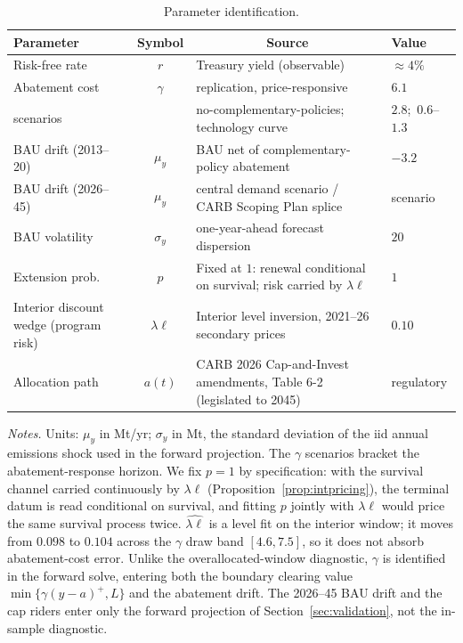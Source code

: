\documentclass[11pt,letterpaper]{article}
\theoremstyle{plain}
\theoremstyle{definition}
\numberwithin{equation}{section}
\begin{document}
\begin{table}[h]\centering
\caption{Parameter identification.}\label{tab:calib}
\footnotesize
\begin{tabular}{@{}l c p{} l@{}}
\toprule
Parameter & Symbol & \multicolumn{1}{c}{Source} & Value\\
\midrule
Risk-free rate        & $r$        & Treasury yield (observable)                          & $\approx 4\%$\\
Abatement cost        & $\gamma$   & \citet{borenstein2019} replication, price-responsive & $6.1$\\
\quad scenarios       &            & no-complementary-policies; technology curve          & $2.8$;\ $0.6$--$1.3$\\
BAU drift (2013--20)  & $\mu_y$    & \citet{borenstein2019} BAU net of complementary-policy abatement       & $-3.2$\\
BAU drift (2026--45)  & $\mu_y$    & \citet{inman2020} central demand scenario / CARB Scoping Plan splice & scenario\\
BAU volatility        & $\sigma_y$ & one-year-ahead \citet{borenstein2019} forecast dispersion              & $20$\\
Extension prob.       & $p$        & Fixed at $1$: renewal conditional on survival; risk carried by $\lambda\ell$ & $1$\\
Interior discount wedge (program risk) & $\lambda\ell$ & Interior level inversion, 2021--26 secondary prices & $0.10$\\
Allocation path       & $a(t)$     & CARB 2026 Cap-and-Invest amendments, Table 6-2 (legislated to 2045) & regulatory\\
\bottomrule
\end{tabular}
\smallskip
{\footnotesize\justifying
\textit{Notes.} Units: $\mu_y$ in Mt/yr; $\sigma_y$ in Mt, the standard deviation of the iid annual emissions shock used in the forward projection. The $\gamma$ scenarios bracket the abatement-response horizon. We fix $p=1$ by specification: with the survival channel carried continuously by $\lambda\ell$ (Proposition~\ref{prop:intpricing}), the terminal datum is read conditional on survival, and fitting $p$ jointly with $\lambda\ell$ would price the same survival process twice. $\widehat{\lambda\ell}$ is a level fit on the interior window; it moves from $0.098$ to $0.104$ across the $\gamma$ draw band $[4.6,7.5]$, so it does not absorb abatement-cost error. Unlike the overallocated-window diagnostic, $\gamma$ is identified in the forward solve, entering both the boundary clearing value $\min\{\gamma(y-a)^{+},L\}$ and the abatement drift. The 2026--45 BAU drift and the cap riders enter only the forward projection of Section~\ref{sec:validation}, not the in-sample diagnostic.\par}
\end{table}
 
\end{document}
